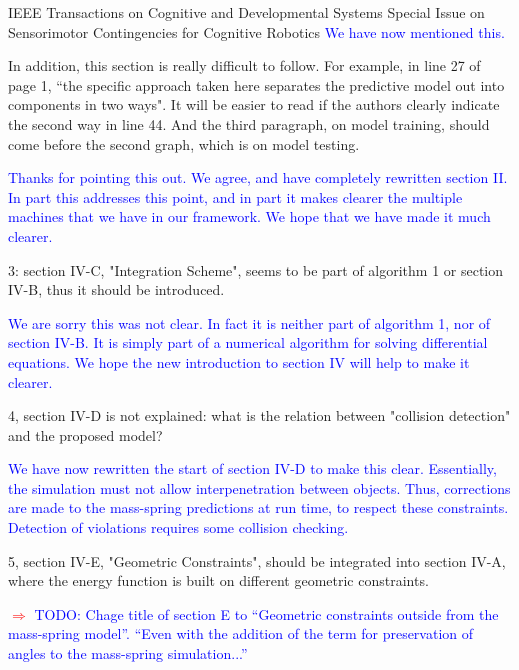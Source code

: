 \documentclass[a4paper,12pt]{letter}
\newcommand{\comment}[1]{\textcolor{blue}{#1}}
\newcommand{\marker}{\hspace*{-1.6em}\textcolor{red}{$\Longrightarrow$}}
\begin{document}
\begin{letter}{IEEE Transactions on Cognitive and Developmental Systems\newline
Special Issue on Sensorimotor Contingencies for Cognitive Robotics}
\comment{We have now mentioned this.}

In addition, this section is really difficult to follow. For example, in line 27 of page 1, “the specific approach taken here separates the predictive model out into components in two ways". It will be easier to read if the authors clearly indicate the second way in line 44. And the third paragraph, on model training, should come before the second graph, which is on model testing. 

\comment{Thanks for pointing this out. We agree, and have completely rewritten section II. In part this addresses this point, and in part it makes clearer the multiple machines that we have in our framework. We hope that we have made it much clearer.}

3: section IV-C, "Integration Scheme", seems to be part of algorithm 1 or section IV-B, thus it should be introduced.

\comment{We are sorry this was not clear. In fact it is neither part of algorithm 1, nor of section IV-B.  It is simply part of a numerical algorithm for solving differential equations.  We hope the new introduction to section IV will help to make it clearer.}

4, section IV-D is not explained: what is the relation between "collision detection" and the proposed model? 

\comment{We have now rewritten the start of section IV-D to make this clear. Essentially, the simulation must not allow interpenetration between objects. Thus, corrections are made to the mass-spring predictions at run time, to respect these constraints. Detection of violations requires some collision checking.}

5, section IV-E, "Geometric Constraints", should be integrated into section IV-A, where the energy function is built on different geometric constraints.

\marker
\comment{TODO: Chage title of section E to ``Geometric constraints outside from the mass-spring model''.  ``Even with the addition of the term for preservation of angles to the mass-spring simulation...''}


\end{letter}
\end{document}
